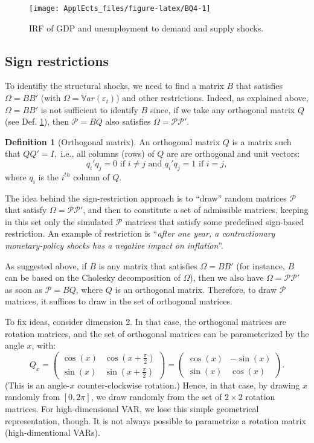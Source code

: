 \documentclass[
  12pt,
]{book}
\theoremstyle{definition}
\newtheorem{definition}{Definition}[chapter]
\theoremstyle{definition}
\theoremstyle{definition}
\theoremstyle{definition}
\theoremstyle{remark}
\begin{document}
\begin{figure}
\texttt{[image: ApplEcts\_files/figure-latex/BQ4-1]} \caption{IRF of GDP and unemployment to demand and supply shocks.}\label{fig:BQ4}
\end{figure}

\hypertarget{Signs}{%
\subsection{Sign restrictions}\label{Signs}}

To identifiy the structural shocks, we need to find a matrix \(B\) that satisfies \(\Omega = BB'\) (with \(\Omega = \mathbb{V}ar(\varepsilon_t)\)) and other restrictions. Indeed, as explained above, \(\Omega = BB'\) is not sufficient to identify \(B\) since, if we take any orthogonal matrix \(Q\) (see Def. \ref{def:orthogonal}), then \(\mathcal{P}=BQ\) also satisfies \(\Omega = \mathcal{P}\mathcal{P}'\).

\begin{definition}[Orthogonal matrix]
\protect\hypertarget{def:orthogonal}{}\label{def:orthogonal}An orthogonal matrix \(Q\) is a matrix such that \(QQ' = I,\) i.e., all columns (rows) of \(Q\) are are
orthogonal and unit vectors:
\[q_i'q_j=0\text{ if }i\neq j\text{ and }q_i'q_j=1\text{ if }i= j,\]
where \(q_i\) is the \(i^{th}\) column of \(Q\).
\end{definition}

The idea behind the sign-restriction approach is to ``draw'' random matrices \(\mathcal{P}\) that satisfy \(\Omega = \mathcal{P}\mathcal{P}'\), and then to constitute a set of admissible matrices, keeping in this set only the simulated \(\mathcal{P}\) matrices that satisfy some predefined sign-based restriction. An example of restriction is ``\emph{after one year, a contractionary monetary-policy shocks has a negative impact on inflation}''.

As suggested above, if \(B\) is any matrix that satisfies \(\Omega = BB'\) (for instance, \(B\) can be based on the Cholesky decomposition of \(\Omega\)), then we also have \(\Omega = \mathcal{P}\mathcal{P}'\) as soon as \(\mathcal{P}=BQ\), where \(Q\) is an orthogonal matrix. Therefore, to draw \(\mathcal{P}\) matrices, it suffices to draw in the set of orthogonal matrices.

To fix ideas, consider dimension 2. In that case, the orthogonal matrices are rotation matrices, and the set of orthogonal matrices can be parameterized by the angle \(x\), with:
\[
Q_x=\begin{pmatrix}\cos(x)&\cos\left(x+\frac{\pi}{2}\right)\\
\sin(x)&\sin\left(x+\frac{\pi}{2}\right)\end{pmatrix}=\begin{pmatrix}\cos(x)&-\sin(x)\\
\sin(x)&\cos(x)\end{pmatrix}.
\]
(This is an angle-\(x\) counter-clockwise rotation.) Hence, in that case, by drawing \(x\) randomly from \([0,2\pi]\), we draw randomly from the set of \(2\times2\) rotation matrices. For high-dimensional VAR, we lose this simple geometrical representation, though. It is not always possible to parametrize a rotation matrix (high-dimentional VARs).
\end{document}
